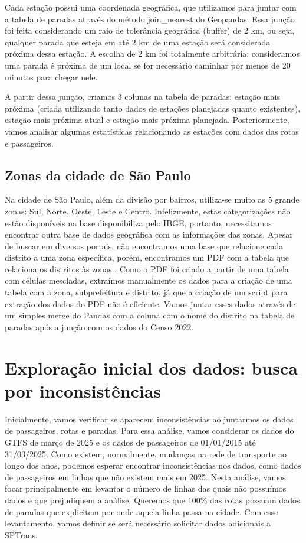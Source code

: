 Cada estação possui uma coordenada geográfica, que utilizamos para juntar com a tabela de paradas através do método join\_nearest do Geopandas. Essa junção foi feita considerando um raio de tolerância geográfica (buffer) de 2 km, ou seja, qualquer parada que esteja em até 2 km de uma estação será considerada próxima dessa estação. A escolha de 2 km foi totalmente arbitrária: consideramos uma parada é próxima de um local se for necessário caminhar por menos de 20 minutos para chegar nele.

A partir dessa junção, criamos 3 colunas na tabela de paradas: estação mais próxima (criada utilizando tanto dados de estações planejadas quanto existentes), estação mais próxima atual e estação mais próxima planejada. Posteriormente, vamos analisar algumas estatísticas relacionando as estações com dados das rotas e passageiros. 

\subsection{Zonas da cidade de São Paulo}

Na cidade de São Paulo, além da divisão por bairros, utiliza-se muito as 5 grande zonas: Sul, Norte, Oeste, Leste e Centro. Infelizmente, estas categorizações não estão disponíveis na base disponibiliza pelo IBGE, portanto, necessitamos encontrar outra base de dados geográfica com as informações das zonas. Apesar de buscar em diversos portais, não encontramos uma base que relacione cada distrito a uma zona específica, porém, encontramos um PDF com a tabela que relaciona os distritos às zonas \citep{prefeituraSPRegioes2008}. Como o PDF foi criado a partir de uma tabela com células mescladas, extraímos manualmente os dados para a criação de uma tabela com a zona, subprefeitura e distrito, já que a criação de um script para extração dos dados do PDF não é eficiente. Vamos juntar esses dados através de um simples merge do Pandas com a coluna com o nome do distrito na tabela de paradas após a junção com os dados do Censo 2022.

\section{Exploração inicial dos dados: busca por inconsistências}
\label{sec:exploracaoinicial}

Inicialmente, vamos verificar se aparecem inconsistências ao juntarmos os dados de passageiros, rotas e paradas. Para essa análise, vamos considerar os dados do GTFS de março de 2025 e os dados de passageiros de 01/01/2015 até 31/03/2025. Como existem, normalmente, mudanças na rede de transporte ao longo dos anos, podemos esperar encontrar inconsistências nos dados, como dados de passageiros em linhas que não existem mais em 2025. Nesta análise, vamos focar principalmente em levantar o número de linhas das quais não possuímos dados e que prejudiquem a análise. Queremos que 100\% das rotas possuam dados de paradas que explicitem por onde aquela linha passa na cidade. Com esse levantamento, vamos definir se será necessário solicitar dados adicionais a SPTrans.

